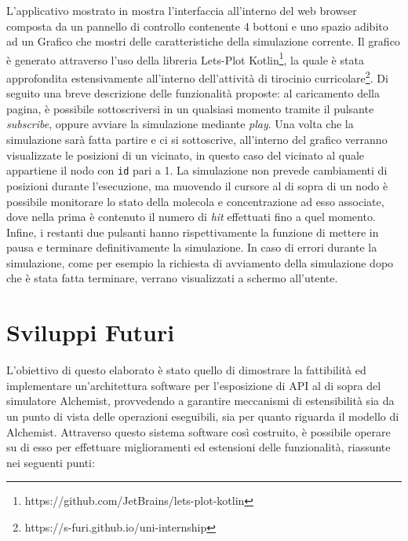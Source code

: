 L'applicativo mostrato in  mostra l'interfaccia all'interno del web browser composta da un pannello di controllo contenente 4 bottoni e uno spazio adibito
ad un Grafico che mostri delle caratteristiche della simulazione corrente. Il grafico è generato attraverso l'uso della libreria Lets-Plot Kotlin\footnote{https://github.com/JetBrains/lets-plot-kotlin},
la quale è stata approfondita estensivamente all'interno dell'attività di tirocinio curricolare\footnote{https://s-furi.github.io/uni-internship}. Di seguito una breve descrizione delle
funzionalità proposte: al caricamento della pagina, è possibile sottoscriversi in un qualsiasi momento tramite il pulsante \textit{subscribe}, oppure avviare la simulazione mediante \textit{play}.
Una volta che la simulazione sarà fatta partire e ci si sottoscrive, all'interno del grafico verranno visualizzate le posizioni di un vicinato, in questo caso del vicinato al quale appartiene il nodo
con \texttt{id} pari a 1. La simulazione non prevede cambiamenti di posizioni durante l'esecuzione, ma muovendo il cursore al di sopra di un nodo è possibile monitorare lo stato
della molecola e concentrazione ad esso associate, dove nella prima è contenuto il numero di \textit{hit} effettuati fino a quel momento. Infine, i restanti due pulsanti hanno rispettivamente
la funzione di mettere in pausa e terminare definitivamente la simulazione. In caso di errori durante la simulazione, come per esempio la richiesta di avviamento della simulazione
dopo che è stata fatta terminare, verrano visualizzati a schermo all'utente.

\section{Sviluppi Futuri}\label{sec:future-works}
L'obiettivo di questo elaborato è stato quello di dimostrare la fattibilità ed implementare un'architettura software per l'esposizione di \ac{API} al di sopra del simulatore Alchemist,
provvedendo a garantire meccanismi di estensibilità sia da un punto di vista delle operazioni eseguibili, sia per quanto riguarda il modello di Alchemist.
Attraverso questo sistema software così costruito, è possibile operare su di esso per effettuare miglioramenti ed estensioni delle funzionalità, riassunte nei seguenti punti:

